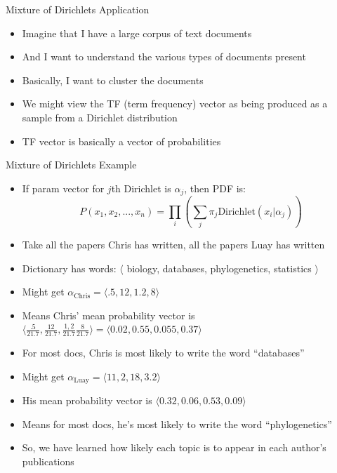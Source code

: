 \documentclass[aspectratio=169]{beamer}
\begin{document}
\begin{frame}{Mixture of Dirichlets Application}

\begin{itemize}
\item Imagine that I have a large corpus of text documents
\item And I want to understand the various types of documents present
\item Basically, I want to cluster the documents
\item We might view the TF (term frequency) vector as being produced as a sample from a Dirichlet distribution
\item TF vector is basically a vector of probabilities
\end{itemize}
\end{frame}


\begin{frame}{Mixture of Dirichlets Example}

\begin{itemize}
\item If param vector for $j$th Dirichlet is $\alpha_j$, then PDF is:
$$P(x_1, x_2, ..., x_n) = \prod_i \left( \sum_j \pi_j \textrm{Dirichlet} (x_i | \alpha_j) \right)$$
	\item Take all the papers Chris has written, all the papers Luay has written
	\item Dictionary has words: $\langle$ biology, databases, phylogenetics, statistics $\rangle$
	\item Might get $\alpha_{\textrm{Chris}} = \langle .5, 12, 1.2, 8 \rangle$
	\item Means Chris' mean probability vector is $\langle \frac{.5}{21.7},  \frac{12}{21.7},  \frac{1,2}{21.7}  \frac{8}{21.7} \rangle = \langle 0.02, 0.55, 0.055, 0.37 \rangle$	
	\item For most docs, Chris is most likely to write the word ``databases''
	\item Might get $\alpha_{\textrm{Luay}} = \langle 11, 2, 18, 3.2 \rangle$
	\item His mean probability vector is $\langle 0.32, 0.06, 0.53, 0.09 \rangle$	
	\item Means for most docs, he's most likely to write the word ``phylogenetics''
\item So, we have learned how likely each topic is to appear in each author's publications
\end{itemize}
\end{frame}
\end{document}
